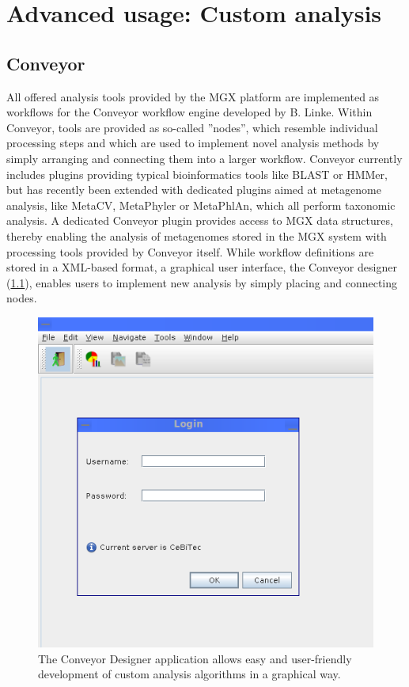 
\chapter{Advanced usage: Custom analysis}
\label{custom}

\section{Conveyor}

All offered analysis tools provided by the MGX platform are implemented as workflows
for the Conveyor\cite{CONVEYOR} workflow engine developed by B. Linke. Within Conveyor,
tools are provided as so-called ''nodes'', which resemble individual processing steps
and which are used to implement novel analysis methods by simply arranging and connecting
them into a larger workflow. Conveyor currently includes plugins providing typical
bioinformatics tools like BLAST or HMMer, but has recently been extended with dedicated
plugins aimed at metagenome analysis, like MetaCV, MetaPhyler or MetaPhlAn, which all
perform taxonomic analysis.
A dedicated Conveyor plugin provides access to MGX data structures, thereby enabling the
analysis of metagenomes stored in the MGX system with processing tools provided by Conveyor
itself.
While workflow definitions are stored in a XML-based format, a graphical user interface,
the Conveyor designer (\ref{designer}), enables users to implement new analysis by simply
placing and connecting nodes.

\begin{figure}[ht]
\centering
\includegraphics[width=.8\textwidth]{img/login-screen}
\caption['Conveyor Designer]{The Conveyor Designer application allows easy and user-friendly
development of custom analysis algorithms in a graphical way.}
\label{designer}
\end{figure}

